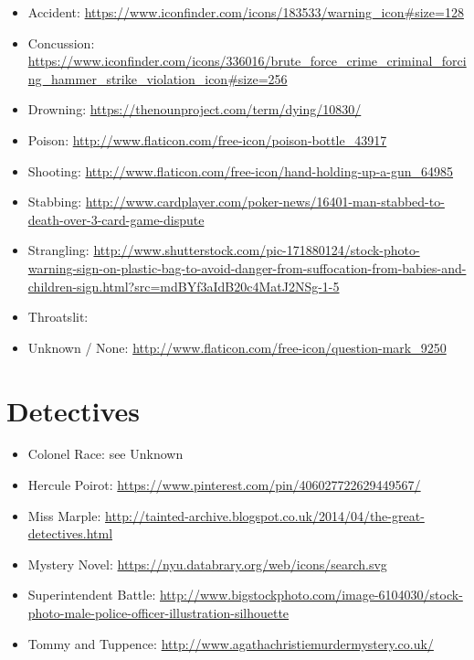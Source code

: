 \documentclass{mproj}
\begin{document}
\begin{itemize}
	\item Accident: \url{https://www.iconfinder.com/icons/183533/warning_icon#size=128}
	\item Concussion: \url{https://www.iconfinder.com/icons/336016/brute_force_crime_criminal_forcing_hammer_strike_violation_icon#size=256}
	\item Drowning: \url{https://thenounproject.com/term/dying/10830/}
	\item Poison: \url{http://www.flaticon.com/free-icon/poison-bottle_43917}
	\item Shooting: \url{http://www.flaticon.com/free-icon/hand-holding-up-a-gun_64985}
	\item Stabbing: \url{http://www.cardplayer.com/poker-news/16401-man-stabbed-to-death-over-3-card-game-dispute}
	\item Strangling: \url{http://www.shutterstock.com/pic-171880124/stock-photo-warning-sign-on-plastic-bag-to-avoid-danger-from-suffocation-from-babies-and-children-sign.html?src=mdBYf3aIdB20c4MatJ2NSg-1-5}
	\item Throatslit: \url{}
	\item Unknown / None: \label{unknown} \url{http://www.flaticon.com/free-icon/question-mark_9250}
\end{itemize}

\section{Detectives}

\begin{itemize}
	\item Colonel Race: see Unknown 
	\item Hercule Poirot: \url{https://www.pinterest.com/pin/406027722629449567/}
	\item Miss Marple: \url{http://tainted-archive.blogspot.co.uk/2014/04/the-great-detectives.html}
	\item Mystery Novel: \url{https://nyu.databrary.org/web/icons/search.svg}
	\item Superintendent Battle: \url{http://www.bigstockphoto.com/image-6104030/stock-photo-male-police-officer-illustration-silhouette}
	\item Tommy and Tuppence: \url{http://www.agathachristiemurdermystery.co.uk/}
\end{itemize}

\end{document}
